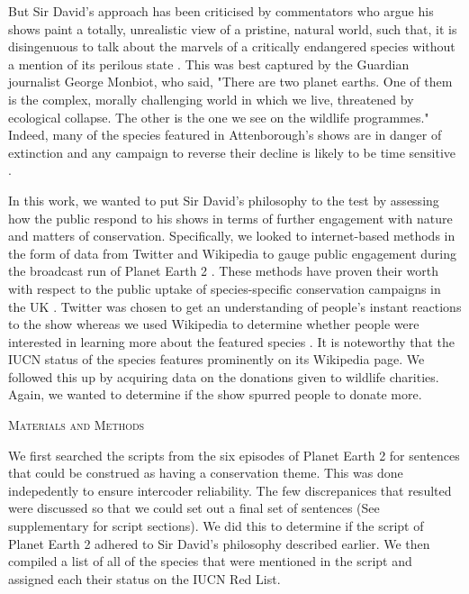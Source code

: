 \documentclass[12pt,letterpaper]{article}
\renewcommand{\section}[1]{%
\bigskip
\begin{center}
\begin{Large}
\normalfont\scshape #1
\medskip
\end{Large}
\end{center}}
\begin{document}
But Sir David's approach has been criticised by commentators who argue his shows paint a totally, unrealistic view of a pristine, natural world, such that, it is disingenuous to talk about the marvels of a critically endangered species without a mention of its perilous state \cite{jeffries2003bbc}. This was best captured by the Guardian journalist George Monbiot, who said, "There are two planet earths. One of them is the complex, morally challenging world in which we live, threatened by ecological collapse. The other is the one we see on the wildlife programmes." Indeed, many of the species featured in Attenborough's shows are in danger of extinction and any campaign to reverse their decline is likely to be time sensitive \cite{biggs2013legal,turvey2007first}. 

In this work, we wanted to put Sir David's philosophy to the test by assessing how the public respond to his shows in terms of further engagement with nature and matters of conservation. Specifically, we looked to internet-based methods in the form of data from Twitter and Wikipedia to gauge public engagement during the broadcast run of Planet Earth 2 \cite{soriano2017internet}. These methods have proven their worth with respect to the public uptake of species-specific conservation campaigns in the UK \cite{soriano2017internet}. Twitter was chosen to get an understanding of people's instant reactions to the show whereas we used Wikipedia to determine whether people were interested in learning more about the featured species \cite{liu2010social}. It is noteworthy that the IUCN status of the species features prominently on its Wikipedia page. We followed this up by acquiring data on the donations given to wildlife charities. Again, we wanted to determine if the show spurred people to donate more.  




%
%
\section{Materials and Methods}
We first searched the scripts from the six episodes of Planet Earth 2 for sentences that could be construed as having a conservation theme. This was done indepedently to ensure intercoder reliability. The few discrepanices that resulted were discussed so that we could set out a final set of sentences (See supplementary for script sections). We did this to determine if the script of Planet Earth 2 adhered to Sir David's philosophy described earlier. We then compiled a list of all of the species that were mentioned in the script and assigned each their status on the IUCN Red List. 
\end{document}

